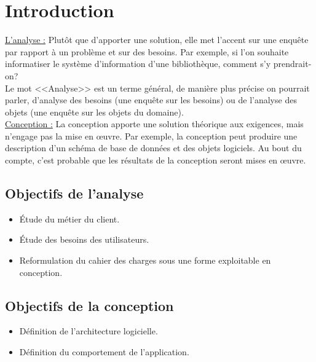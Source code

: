\documentclass[12pt]{report}
\begin{document}
\newpage

\section{Introduction}
\vspace{0.2in}
\uline{L'analyse :} Plutôt que d’apporter une solution, elle met l’accent sur une enquête par rapport à un problème et sur des besoins. Par exemple, si l’on souhaite informatiser le système d’information d’une bibliothèque, comment s’y prendrait-on?
\\
Le mot <<Analyse>> est un terme général, de manière plus précise on pourrait parler, d’analyse des besoins (une enquête sur les besoins) ou de l’analyse des objets (une enquête sur les objets du domaine).
\\
\uline{Conception :} La conception apporte une solution théorique aux exigences, mais n’engage pas la mise en œuvre. Par exemple, la conception peut produire une description d’un schéma de base de données et des objets logiciels. Au bout du compte, c’est probable que les résultats de la conception seront mises en œuvre.

\vspace{-0.1in}

\subsection{Objectifs de l’analyse}
\begin{itemize}
    \item Étude du m\'etier du client.
    \item Étude des besoins des utilisateurs.
    \item Reformulation du cahier des charges sous une forme exploitable en conception.
\end{itemize}

\vspace{-0.15in}

\subsection{Objectifs de la conception}
\begin{itemize}
    \item D\'efinition de l’architecture logicielle.
    \item D\'efinition du comportement de l’application.
\end{itemize}
\end{document}
